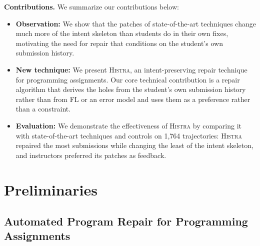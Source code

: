 \documentclass[10pt,conference]{IEEEtran}
\begin{document}
\textbf{Contributions.} We summarize our contributions below:
\begin{itemize}
  \item \textbf{Observation:} We show that the patches of state-of-the-art techniques change much more of the intent skeleton than students do in their own fixes, motivating the need for repair that conditions on the student's own submission history.
  \item \textbf{New technique:} We present \textsc{Histra}, an intent-preserving repair technique for programming assignments. Our core technical contribution is a repair algorithm that derives the holes from the student's own submission history rather than from FL or an error model and uses them as a preference rather than a constraint.
  \item \textbf{Evaluation:} We demonstrate the effectiveness of \textsc{Histra} by comparing it with state-of-the-art techniques and controls on 1,764 trajectories: \textsc{Histra} repaired the most submissions while changing the least of the intent skeleton, and instructors preferred its patches as feedback.
\end{itemize}

\section{Preliminaries}\label{sec:prelim}

\subsection{Automated Program Repair for Programming Assignments}\label{sec:prelim-repair}
\end{document}
